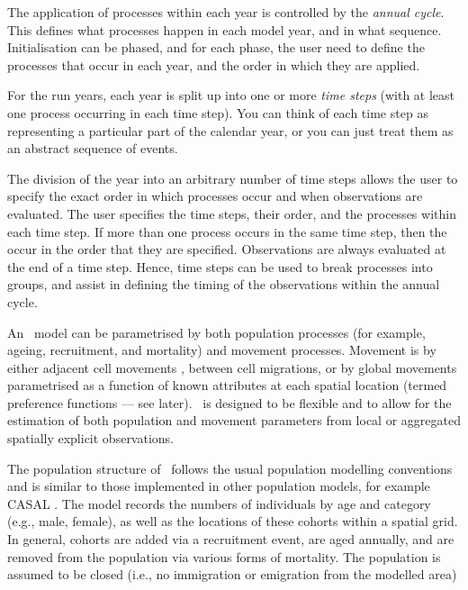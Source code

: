 The application of processes within each year is controlled by the \emph{annual cycle}. This defines what processes happen in each model year, and in what sequence. Initialisation can be phased, and for each phase, the user need to define the processes that occur in each year, and the order in which they are applied. 

For the run years, each year is split up into one or more \emph{time steps} (with at least one process occurring in each time step). You can think of each time step as representing a particular part of the calendar year, or you can just treat them as an abstract sequence of events.

The division of the year into an arbitrary number of time steps allows the user to specify the exact order in which processes occur and when observations are evaluated. The user specifies the time steps, their order, and the processes within each time step. If more than one process occurs in the same time step, then the occur in the order that they are specified. Observations are always evaluated at the end of a time step. Hence, time steps can be used to break processes into groups, and assist in defining the timing of the observations within the annual cycle. 

An \SPM\ model can be parametrised by both population processes (for example, ageing, recruitment, and mortality) and movement processes. Movement is by either adjacent cell movements \NYI, between cell migrations\NYI, or by global movements parametrised as a function of known attributes at each spatial location (termed preference functions --- see later). \SPM\ is designed to be flexible and to allow for the estimation of both population and movement parameters from local or aggregated spatially explicit observations. 

The population structure of \SPM\ follows the usual population modelling conventions and is similar to those implemented in other population models, for example CASAL  \citep{1388}. The model records the numbers of individuals by age and category (e.g., male, female), as well as the locations of these cohorts within a spatial grid. In general, cohorts are added via a recruitment event, are aged annually, and are removed from the population via various forms of mortality. The population is assumed to be closed (i.e., no immigration or emigration from the modelled area)


